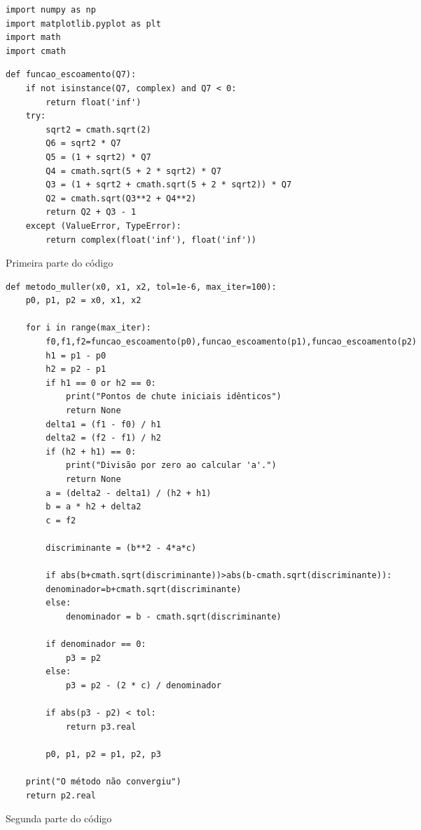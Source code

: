\documentclass[12pt]{article}
\begin{document}
\begin{verbatim} 
import numpy as np
import matplotlib.pyplot as plt
import math
import cmath
\end{verbatim}


\begin{codelisting}[H]
\begin{verbatim} 
def funcao_escoamento(Q7):
    if not isinstance(Q7, complex) and Q7 < 0:
        return float('inf')
    try:
        sqrt2 = cmath.sqrt(2)
        Q6 = sqrt2 * Q7
        Q5 = (1 + sqrt2) * Q7
        Q4 = cmath.sqrt(5 + 2 * sqrt2) * Q7
        Q3 = (1 + sqrt2 + cmath.sqrt(5 + 2 * sqrt2)) * Q7
        Q2 = cmath.sqrt(Q3**2 + Q4**2)
        return Q2 + Q3 - 1
    except (ValueError, TypeError):
        return complex(float('inf'), float('inf'))
\end{verbatim}
\caption{Primeira parte do código}
\label{code:primeira_parte}
\end{codelisting}

\begin{codelisting}[H]
\begin{verbatim} 
def metodo_muller(x0, x1, x2, tol=1e-6, max_iter=100):
    p0, p1, p2 = x0, x1, x2

    for i in range(max_iter):
        f0,f1,f2=funcao_escoamento(p0),funcao_escoamento(p1),funcao_escoamento(p2)
        h1 = p1 - p0
        h2 = p2 - p1
        if h1 == 0 or h2 == 0:
            print("Pontos de chute iniciais idênticos")
            return None
        delta1 = (f1 - f0) / h1
        delta2 = (f2 - f1) / h2
        if (h2 + h1) == 0:
            print("Divisão por zero ao calcular 'a'.")
            return None
        a = (delta2 - delta1) / (h2 + h1)
        b = a * h2 + delta2
        c = f2
        
        discriminante = (b**2 - 4*a*c)
        
        if abs(b+cmath.sqrt(discriminante))>abs(b-cmath.sqrt(discriminante)):
        denominador=b+cmath.sqrt(discriminante)
        else:
            denominador = b - cmath.sqrt(discriminante)
            
        if denominador == 0:
            p3 = p2
        else:
            p3 = p2 - (2 * c) / denominador
        
        if abs(p3 - p2) < tol:
            return p3.real

        p0, p1, p2 = p1, p2, p3

    print("O método não convergiu")
    return p2.real
\end{verbatim}
\caption{Segunda parte do código}
\label{code:segunda_parte}
\end{codelisting}
\end{document}
